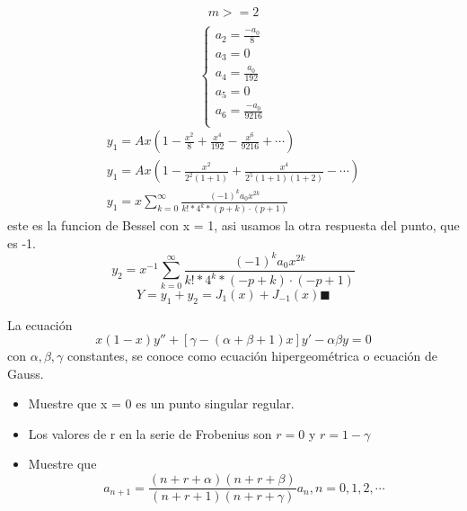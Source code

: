 \begin{mdframed}
\begin{gather*}
       m>=2\\
\end{gather*}
  \begin{equation}
    \begin{cases}
        a_2=\frac{-a_{0}}{8}\\
        a_3=0\\
        a_4=\frac{a_{0}}{192}\\
        a_5=0\\
        a_6=\frac{-a_{0}}{9216}\\
    \end{cases}
\end{equation}
\begin{gather*}
    y_1 = Ax(1-\frac{x^2}{8}+\frac{x^4}{192}-\frac{x^6}{9216}+\cdots)\\
    y_1 = Ax(1-\frac{x^2}{2^2(1+1)}+\frac{x^4}{2^5(1+1)(1+2)}-\cdots)\\
    y_1 = x\sum_{k=0}^{\infty}\frac{(-1)^k a_0 x^{2k}}{k!*4^k*(p+k)\cdot(p+1)}
\end{gather*}
este es la funcion de Bessel con x = 1, asi usamos la otra respuesta del punto, que es -1.
$$
    y_2 = x^{-1}\sum_{k=0}^{\infty}\frac{(-1)^k a_0 x^{2k}}{k!*4^k*(-p+k)\cdot(-p+1)}
$$
$$Y= y_1 +y_2 = J_1(x)+J_{-1}(x) \blacksquare$$
\end{mdframed}



\begin{prob}
 La ecuación
$$x(1 - x)y'' + [\gamma - (\alpha + \beta + 1)x]y' - \alpha\beta y = 0$$
con $\alpha, \beta, \gamma$ constantes, se conoce como ecuación hipergeométrica o ecuación de Gauss.
\begin{itemize}
    \item {Muestre que x = 0 es un punto singular regular.}
    \item {
    Los valores de r en la serie de Frobenius son $r = 0$ y $r = 1 - \gamma$
    }
    \item {Muestre que
        $$a_{n+1}=\frac{(n+r+\alpha)(n+r+\beta)}{(n+r+1)(n+r+\gamma)}a_{n}, n =0,1,2,\cdots$$
    }
\end{itemize}
\end{prob}
    
